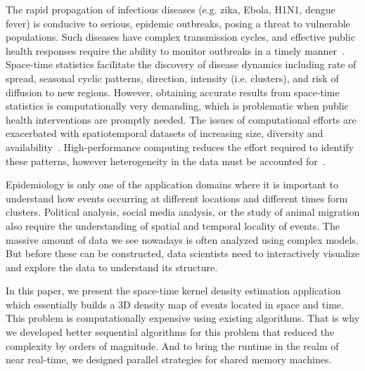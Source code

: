 \documentclass[10pt, conference, compsocconf]{IEEEtran}
\begin{document}
The rapid propagation of infectious diseases (e.g. zika, Ebola, H1N1,
dengue fever) is conducive to serious, epidemic outbreaks, posing a
threat to vulnerable populations. Such diseases have complex
transmission cycles, and effective public health responses require the
ability to monitor outbreaks in a timely
manner~\cite{eisen2011using}. Space-time statistics facilitate the
discovery of disease dynamics including rate of spread, seasonal
cyclic patterns, direction, intensity (i.e. clusters), and risk of
diffusion to new regions.  However, obtaining accurate results from
space-time statistics is computationally very demanding, which is
problematic when public health interventions are promptly needed. The
issues of computational efforts are exacerbated with spatiotemporal
datasets of increasing size, diversity and
availability~\cite{grubesic2014spatial}. High-performance computing
reduces the effort required to identify these patterns, however
heterogeneity in the data must be accounted for~\cite{Hohl16}. 


Epidemiology is only one of the application domains where it is
important to understand how events occurring at different locations and
different times form clusters. Political analysis, social media
analysis, or the study of animal migration also require the
understanding of spatial and temporal locality of events. The massive
amount of data we see nowadays is often analyzed using complex
models. But before these can be constructed, data scientists  need to
interactively visualize and explore the data to understand its
structure. 

%
In this paper, we present the space-time kernel density estimation
application which essentially builds a 3D density map of events
located in space and time. This problem is computationally expensive
using existing algorithms. That is why we developed better sequential
algorithms for this problem that reduced the complexity by orders of
magnitude. And to bring the runtime in the realm of near real-time, we
designed parallel strategies for shared memory machines.
\end{document}
